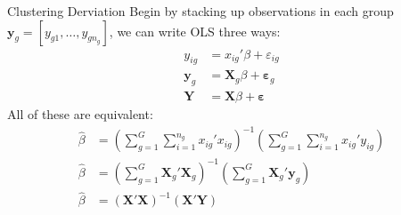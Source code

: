 \begin{frame}{Clustering Derviation}
Begin by stacking up observations in each group $\mathbf{y}_{g }  = [y_{g1},\ldots,y_{g n_g}]$, we can write OLS three ways:
\begin{align*}
y_{ig } &= x_{ig}' \beta + \varepsilon_{ig}\\
\mathbf{y}_{g } &= \mathbf{X}_{g} \beta + \boldsymbol{\varepsilon}_{g}\\
\mathbf{Y} &= \mathbf{X} \beta + \boldsymbol{\varepsilon}
\end{align*}
All of these are equivalent:
\begin{align*}
\widehat {  \beta  } &= \left( \sum _ { g = 1 } ^ { G } \sum _ { i = 1 } ^ { n _ { g } } x _ { i g }' { x } _ { i g } \right) ^ { - 1 } \left( \sum _ { g = 1 } ^ { G } \sum _ { i = 1 } ^ { n _ { g } } x _ { i g }' y _ { i g } \right)\\
\widehat {  \beta  }  &=  \left(  \sum _ { g = 1 } ^ { G } \mathbf{X}_g' \mathbf{X}_g \right)^{-1} \left(  \sum _ { g = 1 } ^ { G } \mathbf{X}_g' \mathbf{y}_g \right)\\
\widehat {  \beta  }  &=  \left( \mathbf{X}' \mathbf{X} \right)^{-1} \left(   \mathbf{X}' \mathbf{Y} \right)\\
\end{align*}
\end{frame}

